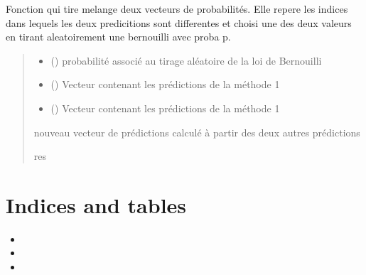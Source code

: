 \documentclass[letterpaper,10pt,french]{sphinxmanual}
\begin{document}

\begin{fulllineitems}
\label{\detokenize{methode_fait_maison:methode_fait_maison.tirage}}
\pysigstartsignatures
{}
\pysigstopsignatures
\sphinxAtStartPar
Fonction qui tire melange deux vecteurs de probabilités. Elle repere les indices dans lequels les deux predicitions
sont differentes et choisi une des deux valeurs en tirant aleatoirement une bernouilli avec proba p.
\begin{quote}\begin{description}
\begin{itemize}
\item {} 
\sphinxAtStartPar
{} () \textendash{} probabilité associé au tirage aléatoire de la loi de Bernouilli

\item {} 
\sphinxAtStartPar
{} () \textendash{} Vecteur contenant les prédictions de la méthode 1

\item {} 
\sphinxAtStartPar
{} () \textendash{} Vecteur contenant les prédictions de la méthode 1

\end{itemize}

\sphinxAtStartPar
nouveau vecteur de prédictions calculé à partir des deux autres prédictions

\sphinxAtStartPar
res

\end{description}\end{quote}

\end{fulllineitems}



\chapter{Indices and tables}
\label{\detokenize{index:indices-and-tables}}\begin{itemize}
\item {} 
\sphinxAtStartPar
{}

\item {} 
\sphinxAtStartPar
{}

\item {} 
\sphinxAtStartPar
{}

\end{itemize}
\end{document}
